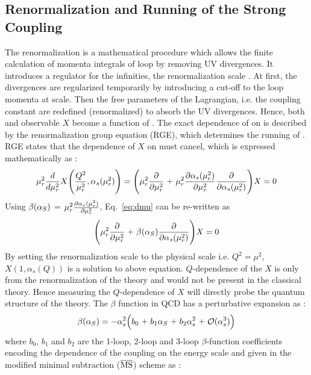 \subsection{Renormalization and Running of the Strong Coupling}
The renormalization is a mathematical procedure which allows the finite calculation of momenta integrals of loop by removing UV divergences. It introduces a regulator for the infinities, the renormalization scale \mur. At first, the divergences are regularized temporarily by introducing a cut-off to the loop momenta at \mur scale. Then the free parameters of the Lagrangian, i.e. the coupling constant are redefined (renormalized) to absorb the UV divergences. Hence, both \alpsq and observable $X$ become a function of \mur. The exact dependence of \alpsmusq on \mur is described by the renormalization group equation (RGE), which determines the running of \alpsmusq. RGE states that the dependence of $X$ on \mur must cancel, which is expressed mathematically as : 
\begin{equation}
\mur^{2}\frac{d}{d\mur^{2}}X\Bigg(\frac{Q^{2}}{\mur^{2}},\alpha_{s}(\mur^{2})\Bigg)=
\Bigg(\mur^{2}\frac{\partial}{\partial\mur^{2}}~\plus \mur^{2}\frac{\partial\alpha_{s}(\mur^{2})}
{\partial\mur^{2}}\frac{\partial}{\partial\alpha_{s}(\mur^{2})}\Bigg)X=0
\label{eq:dmu}
\end{equation}
Using $\beta(\alpha_S)$ = $\mur^{2}\frac{\partial\alpha_{s}(\mur^{2})}{\partial\mur^{2}}$, Eq.~\ref{eq:dmu} can be re-written as 
\begin{equation}
\Bigg(\mur^{2}\frac{\partial}{\partial\mur^{2}}~\plus \beta(\alps)\frac{\partial}{\partial\alpha_{s}(\mur^{2})}\Bigg)X=0
\label{eq:dmu2}
\end{equation}
By setting the renormalization scale to the physical scale i.e. $Q^{2}=\mu^{2}$, $X(1,\alpha_{s}(Q))$ is a solution to above equation. $Q$-dependence of the $X$ is only from the renormalization of the theory and would not be present in the classical theory. Hence measuring the $Q$-dependence of $X$ will directly probe the quantum structure of the theory. The $\beta$ function in QCD has a perturbative expansion as : 
\begin{equation}
\beta(\alps)=-\alpha_{s}^{2}\Big(b_0~\plus b_1\alps~\plus b_2\alpha_{s}^{2}~\plus {\cal O}(\alpha_{s}^{3})\Big) 
\label{eq:beta}
\end{equation}
where $b_0$, $b_1$ and $b_2$ are the 1-loop, 2-loop and 3-loop $\beta$-function coefficients encoding the dependence of the coupling on the energy scale and given in the modified minimal subtraction ($\overline{\rm MS}$) scheme \cite{tHooft:1973mfk,Weinberg:1951ss} as :
